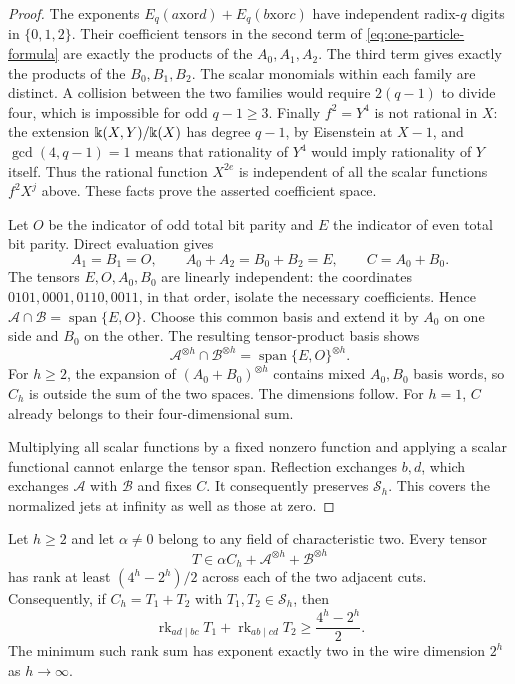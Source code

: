 \begin{proof}
The exponents $E_q(a\mathbin{\mathrm{xor}}d)+
E_q(b\mathbin{\mathrm{xor}}c)$ have independent radix-$q$ digits
in $\{0,1,2\}$. Their coefficient tensors in the second term of
\eqref{eq:one-particle-formula} are exactly the products of the
$A_0,A_1,A_2$. The third term gives exactly the products of the
$B_0,B_1,B_2$. The scalar monomials within each family are distinct.
A collision between the two families would require
$2(q-1)$ to divide four, which is impossible for odd $q-1\ge3$.
Finally $f^2=Y^4$ is not rational in $X$: the extension
$\Bbbk(X,Y)/\Bbbk(X)$ has degree $q-1$, by Eisenstein at $X-1$,
and $\gcd(4,q-1)=1$ means that rationality of $Y^4$ would imply
rationality of $Y$ itself. Thus the rational function $X^{2e}$
is independent of all the scalar functions $f^2X^j$ above.
These facts prove the asserted coefficient space.

Let $O$ be the indicator of odd total bit parity and $E$ the
indicator of even total bit parity. Direct evaluation gives
\[
 A_1=B_1=O,\qquad A_0+A_2=B_0+B_2=E,\qquad C=A_0+B_0.
\]
The tensors $E,O,A_0,B_0$ are linearly independent: the coordinates
$0101,0001,0110,0011$, in that order, isolate the necessary
coefficients. Hence
$\mathcal A\cap\mathcal B=\operatorname{span}\{E,O\}$.
Choose this common basis and extend it by $A_0$ on one side and
$B_0$ on the other. The resulting tensor-product basis shows
\[
 \mathcal A^{\otimes h}\cap\mathcal B^{\otimes h}
       =\operatorname{span}\{E,O\}^{\otimes h}.
\]
For $h\ge2$, the expansion of $(A_0+B_0)^{\otimes h}$ contains
mixed $A_0,B_0$ basis words, so $C_h$ is outside the sum of the
two spaces. The dimensions follow. For $h=1$, $C$ already belongs
to their four-dimensional sum.

Multiplying all scalar functions by a fixed nonzero function and
applying a scalar functional cannot enlarge the tensor span.
Reflection exchanges $b,d$, which exchanges $\mathcal A$ with
$\mathcal B$ and fixes $C$. It consequently preserves $\mathcal S_h$.
This covers the normalized jets at infinity as well as those at zero.
\end{proof}

\begin{theorem}
\label{thm:one-particle-rank-barrier}
Let $h\ge2$ and let $\alpha\ne0$ belong to any field of
characteristic two. Every tensor
\[
 T\in\alpha C_h+\mathcal A^{\otimes h}+\mathcal B^{\otimes h}
\]
has rank at least $(4^h-2^h)/2$ across each of the two adjacent cuts.
Consequently, if $C_h=T_1+T_2$ with $T_1,T_2\in\mathcal S_h$, then
\[
 \operatorname{rk}_{ad\mid bc}T_1+
 \operatorname{rk}_{ab\mid cd}T_2\ge\frac{4^h-2^h}{2}.
\]
The minimum such rank sum has exponent exactly two in the wire
dimension $2^h$ as $h\to\infty$.
\end{theorem}

